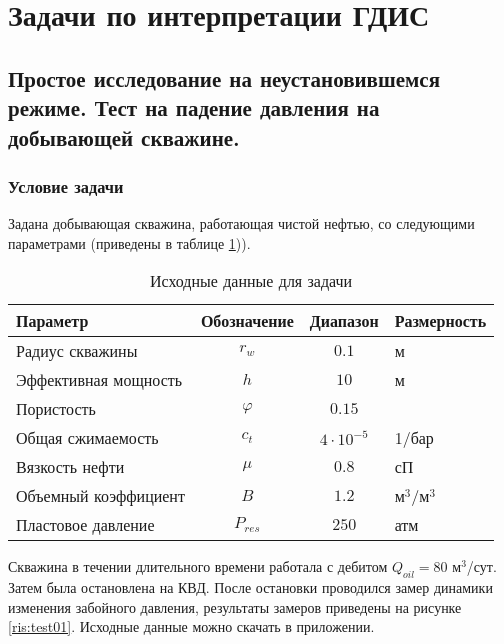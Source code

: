 \section{Задачи по интерпретации ГДИС}

\subsection{Простое исследование на неустановившемся режиме. Тест на падение давления на добывающей скважине.}

\subsubsection{Условие задачи}
Задана добывающая скважина, работающая чистой нефтью, со следующими параметрами (приведены в таблице \ref{table:test_data1})).

\begin{table}[h!]
	\ttabbox
	{
		\caption{Исходные данные для задачи}
		\label{table:test_data1}
	}
	{
		\begin{tabular}{|l|c|c|l|}
			\hline
			\rowcolor{lightgray}	Параметр& Обозначение &Диапазон &Размерность \\
			\hline
			Радиус скважины&  $r_{w} $&$ 0.1 $ &м \\
			\hline
			Эффективная мощность & $h $&$ 10$ &м  \\
			\hline
			Пористость & $\varphi $&$ 0.15 $&  \\
			\hline
			Общая сжимаемость& $c_{t} $&$ 4\cdot 10^{-5}  $ & 1/бар  \\
			\hline
			Вязкость нефти& $\mu $&$ 0.8$& сП  \\
			\hline
			Объемный коэффициент   &$B $&$ 1.2$& м$^3$/м$^3$  \\
			\hline
			Пластовое давление   &$P_{res} $&$ 250$& атм  \\
			\hline
		\end{tabular}
		
	}
\end{table}

Скважина в течении длительного времени работала с дебитом $Q_{oil} = 80$ м$^3$/сут. Затем была остановлена на КВД. После остановки проводился замер динамики изменения забойного давления, результаты замеров приведены на рисунке \ref{ris:test01}. Исходные данные можно скачать в приложении.


